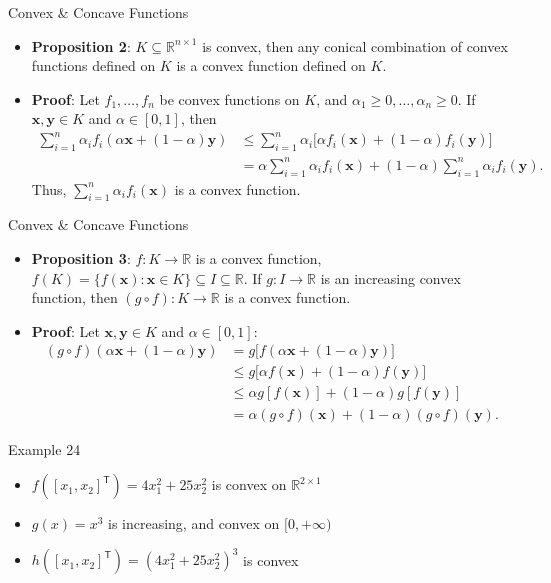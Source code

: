 \documentclass[aspectratio=169,hyperref,UTF8,CJK]{beamer}
\newcommand{\R}{\mathbb{R}}
\newcommand{\trans}{\mathsf{T}}
\newcommand{\vect}[1]{\boldsymbol{#1}}
\begin{document}
\begin{frame}{Convex \& Concave Functions}
  \small
  \begin{itemize}
    \item \textbf{Proposition 2}: $K\subseteq\R^{n\times1}$ is convex, then any conical combination of convex functions defined on $K$ is a convex function defined on $K$.
    \item \textbf{Proof}: Let $f_1,\ldots,f_n$ be convex functions on $K$, and $\alpha_1\ge0,\ldots,\alpha_n\ge0$. If $\vect{x},\vect{y}\in K$ and $\alpha\in[0,1]$, then
      \begin{align*}
        \sum_{i=1}^{n}\alpha_i f_i(\alpha\vect{x}+(1-\alpha)\vect{y})
        &\le\sum_{i=1}^{n}\alpha_i\bigl[\alpha f_i(\vect{x})+(1-\alpha)f_i(\vect{y})\bigr]\\
        &=\alpha\sum_{i=1}^{n}\alpha_i f_i(\vect{x})+(1-\alpha)\sum_{i=1}^{n}\alpha_i f_i(\vect{y}).
      \end{align*}
      Thus, $\sum_{i=1}^{n}\alpha_i f_i(\vect{x})$ is a convex function.
  \end{itemize}
\end{frame}

\begin{frame}{Convex \& Concave Functions}
  \small
  \begin{itemize}
    \item \textbf{Proposition 3}: $f:K\to\R$ is a convex function,
      $f(K)=\{f(\vect{x}):\vect{x}\in K\}\subseteq I\subseteq\R$.
      If $g:I\to\R$ is an increasing convex function, then $(g\circ f):K\to\R$ is a convex function.
    \item \textbf{Proof}: Let $\vect{x},\vect{y}\in K$ and $\alpha\in[0,1]$:
      \begin{align*}
        (g\circ f)(\alpha\vect{x}+(1-\alpha)\vect{y})
        &=g\bigl[f(\alpha\vect{x}+(1-\alpha)\vect{y})\bigr]\\
        &\le g\bigl[\alpha f(\vect{x})+(1-\alpha)f(\vect{y})\bigr]\\
        &\le\alpha g[f(\vect{x})]+(1-\alpha)g[f(\vect{y})]\\
        &=\alpha(g\circ f)(\vect{x})+(1-\alpha)(g\circ f)(\vect{y}).
      \end{align*}
  \end{itemize}
\end{frame}

\begin{frame}{Example 24}
  \begin{itemize}
    \item $f([x_1,x_2]^{\trans})=4x_1^2+25x_2^2$ is convex on $\R^{2\times1}$
    \item $g(x)=x^3$ is increasing, and convex on $[0,+\infty)$
    \item $h([x_1,x_2]^{\trans})=(4x_1^2+25x_2^2)^3$ is convex
  \end{itemize}
\end{frame}
\end{document}
